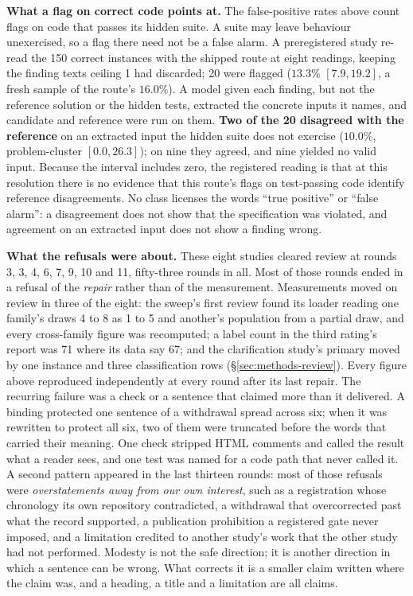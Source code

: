 \textbf{What a flag on correct code points at.} The false-positive rates above count flags on code
that passes its hidden suite. A suite may leave behaviour unexercised, so a flag there need not be
a false alarm. A preregistered study re-read the 150 correct instances with the shipped route at
eight readings, keeping the finding texts ceiling 1 had discarded; 20 were flagged ($13.3\%$
$[7.9, 19.2]$, a fresh sample of the route's $16.0\%$). A model given each finding, but not the
reference solution or the hidden tests, extracted the concrete inputs it names, and candidate and
reference were run on them. \textbf{Two of the 20 disagreed with the reference} on an extracted
input the hidden suite does not exercise ($10.0\%$, problem-cluster $[0.0, 26.3]$); on nine they
agreed, and nine yielded no valid input. Because the interval includes zero, the registered
reading is that at this resolution there is no evidence that this route's flags on test-passing
code identify reference disagreements. No class licenses the words ``true positive'' or ``false
alarm'': a disagreement does not show that the specification was violated, and agreement on an
extracted input does not show a finding wrong.

\textbf{What the refusals were about.} These eight studies cleared review at rounds 3, 3, 4, 6, 7,
9, 10 and 11, fifty-three rounds in all. Most of those rounds ended in a refusal of the
\emph{repair} rather than of the measurement. Measurements moved on review in three of the eight:
the sweep's first review found its loader reading one family's draws 4 to 8 as 1 to 5 and
another's population from a partial draw, and every cross-family figure was recomputed; a label
count in the third rating's report was 71 where its data say 67; and the clarification study's
primary moved by one instance and three classification rows (\S\ref{sec:methods-review}). Every
figure above reproduced independently at every round after its last repair. The recurring failure
was a check or a sentence that claimed more than it delivered. A binding protected one sentence of
a withdrawal spread across six; when it was rewritten to protect all six, two of them were
truncated before the words that carried their meaning. One check stripped HTML comments and called
the result what a reader sees, and one test was named for a code path that never called it. A
second pattern appeared in the last thirteen rounds: most of those refusals were
\emph{overstatements away from our own interest}, such as a registration whose chronology its own
repository contradicted, a withdrawal that overcorrected past what the record supported, a
publication prohibition a registered gate never imposed, and a limitation credited to another
study's work that the other study had not performed. Modesty is not the safe direction; it is
another direction in which a sentence can be wrong. What corrects it is a smaller claim written
where the claim was, and a heading, a title and a limitation are all claims.

